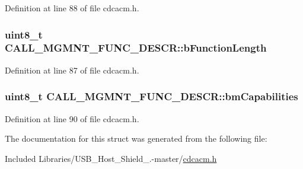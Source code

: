 \-Definition at line 88 of file cdcacm.\-h.

\hypertarget{struct_c_a_l_l___m_g_m_n_t___f_u_n_c___d_e_s_c_r_ae5ab7e23e6f5268f042b1cec3986867a}{
\subsubsection[{b\-Function\-Length}]{\setlength{\rightskip}{0pt plus 5cm}uint8\-\_\-t {\bf \-C\-A\-L\-L\-\_\-\-M\-G\-M\-N\-T\-\_\-\-F\-U\-N\-C\-\_\-\-D\-E\-S\-C\-R\-::b\-Function\-Length}}}\label{struct_c_a_l_l___m_g_m_n_t___f_u_n_c___d_e_s_c_r_ae5ab7e23e6f5268f042b1cec3986867a}


\-Definition at line 87 of file cdcacm.\-h.

\hypertarget{struct_c_a_l_l___m_g_m_n_t___f_u_n_c___d_e_s_c_r_a76161d5fa6c12239aad097f5010825c2}{
\subsubsection[{bm\-Capabilities}]{\setlength{\rightskip}{0pt plus 5cm}uint8\-\_\-t {\bf \-C\-A\-L\-L\-\_\-\-M\-G\-M\-N\-T\-\_\-\-F\-U\-N\-C\-\_\-\-D\-E\-S\-C\-R\-::bm\-Capabilities}}}\label{struct_c_a_l_l___m_g_m_n_t___f_u_n_c___d_e_s_c_r_a76161d5fa6c12239aad097f5010825c2}


\-Definition at line 90 of file cdcacm.\-h.



\-The documentation for this struct was generated from the following file\-:\begin{DoxyCompactItemize}
\item 
\-Included Libraries/\-U\-S\-B\-\_\-\-Host\-\_\-\-Shield\-\_.-\/master/\hyperlink{cdcacm_8h}{cdcacm.\-h}\end{DoxyCompactItemize}
